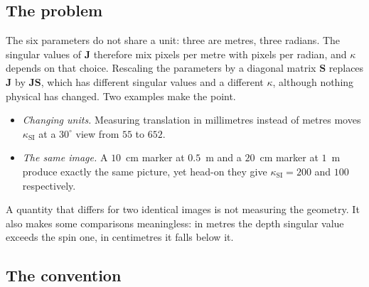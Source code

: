 \documentclass[11pt,a4paper]{article}
\theoremstyle{remark}
\newcommand{\Jmat}{\mathbf{J}}
\newcommand{\Smat}{\mathbf{S}}
\begin{document}
\subsection{The problem}

The six parameters do not share a unit: three are metres, three radians. The
singular values of $\Jmat$ therefore mix pixels per metre with pixels per
radian, and $\kappa$ depends on that choice. Rescaling the parameters by a
diagonal matrix $\Smat$ replaces $\Jmat$ by $\Jmat\Smat$, which has different
singular values and a different $\kappa$, although nothing physical has
changed. Two examples make the point.
\begin{itemize}[leftmargin=*]
  \item \emph{Changing units.} Measuring translation in millimetres instead of
        metres moves $\kappa_{\mathrm{SI}}$ at a $30^{\circ}$ view from $55$ to
        $652$.
  \item \emph{The same image.} A $10$~cm marker at $0.5$~m and a $20$~cm marker
        at $1$~m produce exactly the same picture, yet head-on they give
        $\kappa_{\mathrm{SI}} = 200$ and $100$ respectively.
\end{itemize}
A quantity that differs for two identical images is not measuring the
geometry. It also makes some comparisons meaningless: in metres the depth
singular value exceeds the spin one, in centimetres it falls below it.

\subsection{The convention}
\end{document}
